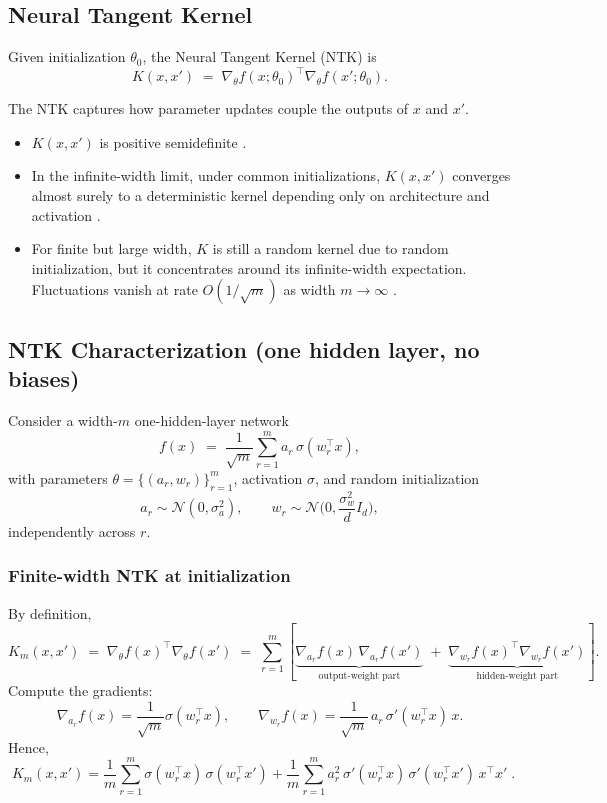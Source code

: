 \subsection{Neural Tangent Kernel}

\begin{definition}
	Given initialization $\theta_0$, the Neural Tangent Kernel (NTK) is
	\[
		K(x,x') \;=\; \nabla_\theta f(x;\theta_0)^\top \nabla_\theta f(x';\theta_0).
	\]
\end{definition}

\noindent
The NTK captures how parameter updates couple the outputs of $x$ and $x'$.

\begin{remark}\label{rem:ntk}
	\leavevmode
	\begin{itemize}
		\item $K(x,x')$ is positive semidefinite \citep{jacot2018ntk}.
		\item In the infinite-width limit, under common initializations, $K(x,x')$ converges almost surely to a deterministic kernel depending only on architecture and activation \citep{jacot2018ntk, lee2020wide}.
		\item For finite but large width, $K$ is still a random kernel due to random initialization,
		      but it concentrates around its infinite-width expectation.
		      Fluctuations vanish at rate $O(1/\sqrt{m})$ as width $m \to \infty$
		      \citep{jacot2018ntk, lee2020wide}.
	\end{itemize}
\end{remark}

\subsection{NTK Characterization (one hidden layer, no biases)}\label{subsec:ntk-onelayer}

Consider a width-$m$ one-hidden-layer network
\[
	f(x)\;=\;\frac{1}{\sqrt{m}}\sum_{r=1}^m a_r\,\sigma(w_r^\top x),
\]
with parameters $\theta=\{(a_r,w_r)\}_{r=1}^m$, activation $\sigma$, and random initialization
\[
	a_r \sim \mathcal N(0,\sigma_a^2),\qquad
	w_r \sim \mathcal N\!\Big(0,\frac{\sigma_w^2}{d}I_d\Big),
\]
independently across $r$.

\subsubsection*{Finite-width NTK at initialization}
By definition,
\[
	K_m(x,x') \;=\; \nabla_\theta f(x)^\top \nabla_\theta f(x')
	\;=\;\sum_{r=1}^m\!\left[
		\underbrace{\nabla_{a_r} f(x)\,\nabla_{a_r} f(x')}_{\text{output-weight part}}
		\;+\;
		\underbrace{\nabla_{w_r} f(x)^\top \nabla_{w_r} f(x')}_{\text{hidden-weight part}}
		\right].
\]
Compute the gradients:
\[
	\nabla_{a_r} f(x)=\frac{1}{\sqrt{m}}\sigma(w_r^\top x),
	\qquad
	\nabla_{w_r} f(x)=\frac{1}{\sqrt{m}}\,a_r\,\sigma'(w_r^\top x)\,x.
\]
Hence,
\[
	\boxed{\;
		K_m(x,x')
		=\frac{1}{m}\sum_{r=1}^m \sigma(w_r^\top x)\,\sigma(w_r^\top x')
		+\frac{1}{m}\sum_{r=1}^m a_r^2\,\sigma'(w_r^\top x)\,\sigma'(w_r^\top x')\,x^\top x'\; }.
\]

